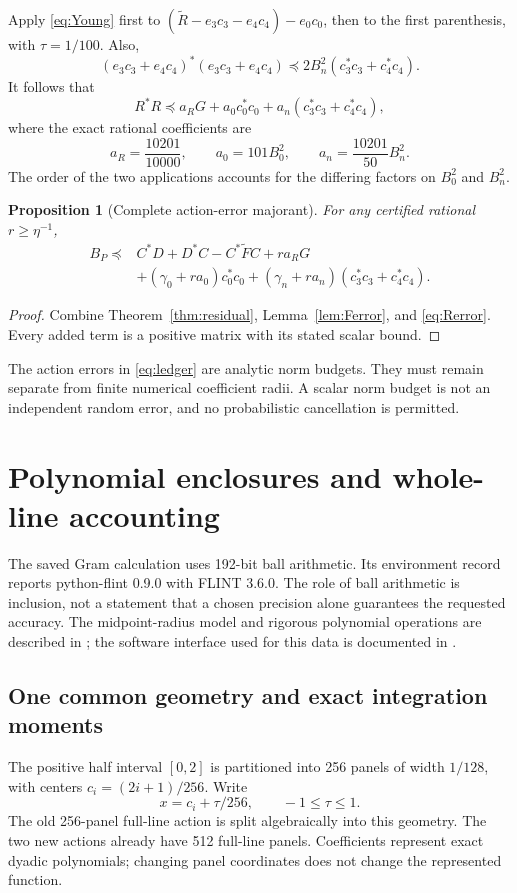\documentclass[11pt,a4paper]{article}
\numberwithin{equation}{section}
\newtheorem{proposition}[theorem]{Proposition}
\theoremstyle{definition}\newtheorem{definition}[theorem]{Definition}
\theoremstyle{remark}\newtheorem{remark}[theorem]{Remark}
\begin{document}
Apply \eqref{eq:Young} first to $(\widetilde R-e_3c_3-e_4c_4)-e_0c_0$, then to the first parenthesis, with $\tau=1/100$. Also,
\[
 (e_3c_3+e_4c_4)^*(e_3c_3+e_4c_4)
 \preceq2B_n^2(c_3^*c_3+c_4^*c_4).
\]
It follows that
\begin{equation}\label{eq:Rerror}
 R^*R\preceq a_RG+a_0c_0^*c_0+a_n(c_3^*c_3+c_4^*c_4),
\end{equation}
where the exact rational coefficients are
\begin{equation}\label{eq:acoeffs}
 a_R=\frac{10201}{10000},\qquad
 a_0=101B_0^2,\qquad a_n=\frac{10201}{50}B_n^2.
\end{equation}
The order of the two applications accounts for the differing factors on $B_0^2$ and $B_n^2$.

\begin{proposition}[Complete action-error majorant]\label{prop:ledger}
For any certified rational $r\ge\eta^{-1}$,
\begin{align}\label{eq:ledger}
 B_P\preceq{}&C^*D+D^*C-C^*\widetilde FC+r a_RG\nonumber\\
 &+(\gamma_0+r a_0)c_0^*c_0
 +(\gamma_n+r a_n)(c_3^*c_3+c_4^*c_4).
\end{align}
\end{proposition}
\begin{proof}
Combine Theorem~\ref{thm:residual}, Lemma~\ref{lem:Ferror}, and \eqref{eq:Rerror}. Every added term is a positive matrix with its stated scalar bound.
\end{proof}

The action errors in \eqref{eq:ledger} are analytic norm budgets. They must remain separate from finite numerical coefficient radii. A scalar norm budget is not an independent random error, and no probabilistic cancellation is permitted.

\section{Polynomial enclosures and whole-line accounting}\label{sec:quadrature}
The saved Gram calculation uses 192-bit ball arithmetic. Its environment record reports python-flint 0.9.0 with FLINT 3.6.0. The role of ball arithmetic is inclusion, not a statement that a chosen precision alone guarantees the requested accuracy. The midpoint-radius model and rigorous polynomial operations are described in \cite{johansson}; the software interface used for this data is documented in \cite{pythonflint}.

\subsection{One common geometry and exact integration moments}
The positive half interval $[0,2]$ is partitioned into 256 panels of width $1/128$, with centers $c_i=(2i+1)/256$. Write
\[
 x=c_i+\tau/256,\qquad -1\le\tau\le1.
\]
The old 256-panel full-line action is split algebraically into this geometry. The two new actions already have 512 full-line panels. Coefficients represent exact dyadic polynomials; changing panel coordinates does not change the represented function.
\end{document}
